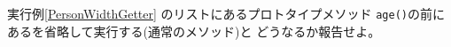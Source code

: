 \begin{Prob}\upshape
 実行例\else\ref{PersonWidthGetter}\fi
 のリストにあるプロトタイプメソッド
 \texttt{age()}の前にあるを省略して実行する(通常のメソッド)と
 どうなるか報告せよ。
\end{Prob}
\ifText %
\ \vspace{0.2\textheight}\fi
